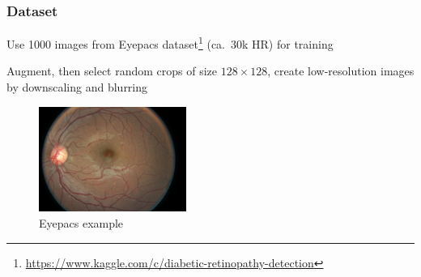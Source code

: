 \documentclass{beamer}
\begin{document}
\begin{frame}
   \frametitle{Dataset}
   Use 1000 images from Eyepacs dataset\footnote{\url{https://www.kaggle.com/c/diabetic-retinopathy-detection}} (ca.\ 30k HR) for training

   Augment, then select random crops of size $128 \times 128$, create low-resolution images by downscaling and blurring

   \begin{figure}[h]
     \centering
     \includegraphics[width=0.43\textwidth]{eyepacs_example}
     \caption*{Eyepacs example}
   \end{figure}
\end{frame}
\end{document}
